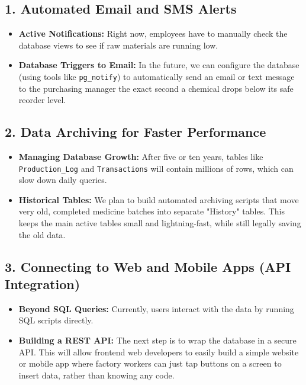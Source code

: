 \documentclass[12pt, a4paper]{article}
\begin{document}
\vspace{0.5cm}

\subsection*{1. Automated Email and SMS Alerts}
\begin{itemize}
    \item[$\rightarrow$] \textbf{Active Notifications:} Right now, employees have to manually check the database views to see if raw materials are running low. 
    \item[$\rightarrow$] \textbf{Database Triggers to Email:} In the future, we can configure the database (using tools like \texttt{pg\_notify}) to automatically send an email or text message to the purchasing manager the exact second a chemical drops below its safe reorder level.
\end{itemize}

\subsection*{2. Data Archiving for Faster Performance}
\begin{itemize}
    \item[$\rightarrow$] \textbf{Managing Database Growth:} After five or ten years, tables like \texttt{Production\_Log} and \texttt{Transactions} will contain millions of rows, which can slow down daily queries.
    \item[$\rightarrow$] \textbf{Historical Tables:} We plan to build automated archiving scripts that move very old, completed medicine batches into separate "History" tables. This keeps the main active tables small and lightning-fast, while still legally saving the old data.
\end{itemize}

\subsection*{3. Connecting to Web and Mobile Apps (API Integration)}
\begin{itemize}
    \item[$\rightarrow$] \textbf{Beyond SQL Queries:} Currently, users interact with the data by running SQL scripts directly.
    \item[$\rightarrow$] \textbf{Building a REST API:} The next step is to wrap the database in a secure API. This will allow frontend web developers to easily build a simple website or mobile app where factory workers can just tap buttons on a screen to insert data, rather than knowing any code.
\end{itemize}
\end{document}
